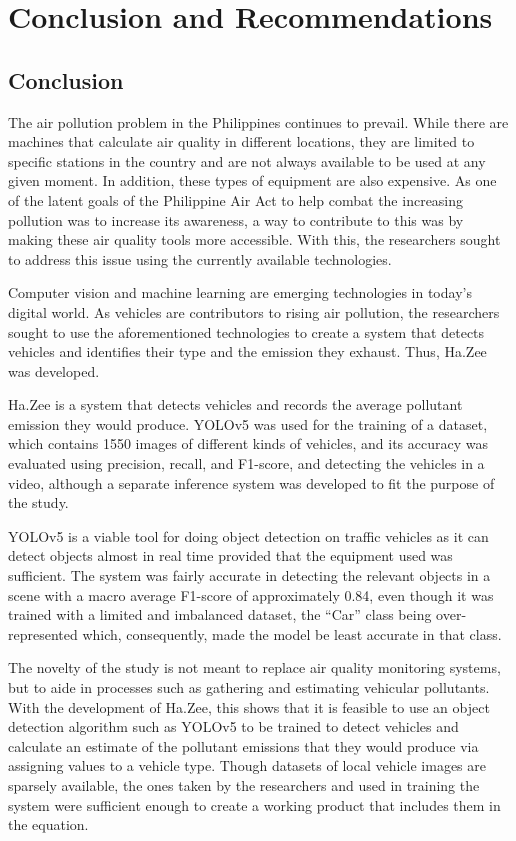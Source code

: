 \chapter{Conclusion and Recommendations}

\section{Conclusion}
The air pollution problem in the Philippines continues to prevail. While there are machines that calculate air quality in different locations, they are limited to specific stations in the country and are not always available to be used at any given moment. In addition, these types of equipment are also expensive. As one of the latent goals of the Philippine Air Act to help combat the increasing pollution was to increase its awareness, a way to contribute to this was by making these air quality tools more accessible. With this, the researchers sought to address this issue using the currently available technologies.

Computer vision and machine learning are emerging technologies in today’s digital world. As vehicles are contributors to rising air pollution, the researchers sought to use the aforementioned technologies to create a system that detects vehicles and identifies their type and the emission they exhaust. Thus, Ha.Zee was developed.

Ha.Zee is a system that detects vehicles and records the average pollutant emission they would produce. YOLOv5 was used for the training of a dataset, which contains 1550 images of different kinds of vehicles, and its accuracy was evaluated using precision, recall, and F1-score, and detecting the vehicles in a video, although a separate inference system was developed to fit the purpose of the study. 

YOLOv5 is a viable tool for doing object detection on traffic vehicles as it can detect objects almost in real time provided that the equipment used was sufficient. The system was fairly accurate in detecting the relevant objects in a scene with a macro average F1-score of approximately 0.84, even though it was trained with a limited and imbalanced dataset, the “Car” class being over-represented which, consequently, made the model be least accurate in that class.

The novelty of the study is not meant to replace air quality monitoring systems, but to aide in processes such as gathering and estimating vehicular pollutants. With the development of Ha.Zee, this shows that it is feasible to use an object detection algorithm such as YOLOv5 to be trained to detect vehicles and calculate an estimate of the pollutant emissions that they would produce via assigning values to a vehicle type.  Though datasets of local vehicle images are sparsely available, the ones taken by the researchers and used in training the system were sufficient enough to create a working product that includes them in the equation.

